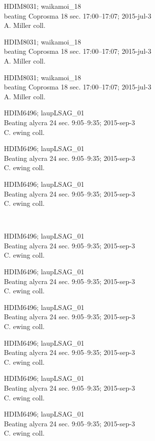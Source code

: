\documentclass[2pt]{extarticle}
\begin{document}
\noindent
\parbox{0.16\textwidth}{\tiny \raggedright \rule[-0.3\baselineskip]{0pt}{10pt}HDIM8031; waikamoi\_18\\ beating Coprosma 18 sec. 17:00--17:07; 2015-jul-3\\ A. Miller coll.}
\parbox{0.16\textwidth}{\tiny \raggedright \rule[-0.3\baselineskip]{0pt}{10pt}HDIM8031; waikamoi\_18\\ beating Coprosma 18 sec. 17:00--17:07; 2015-jul-3\\ A. Miller coll.}
\parbox{0.16\textwidth}{\tiny \raggedright \rule[-0.3\baselineskip]{0pt}{10pt}HDIM8031; waikamoi\_18\\ beating Coprosma 18 sec. 17:00--17:07; 2015-jul-3\\ A. Miller coll.}
\parbox{0.16\textwidth}{\tiny \raggedright \rule[-0.3\baselineskip]{0pt}{10pt}HDIM6496; laupLSAG\_01\\ Beating alycra 24 sec. 9:05--9:35; 2015-sep-3\\ C. ewing coll.}
\parbox{0.16\textwidth}{\tiny \raggedright \rule[-0.3\baselineskip]{0pt}{10pt}HDIM6496; laupLSAG\_01\\ Beating alycra 24 sec. 9:05--9:35; 2015-sep-3\\ C. ewing coll.}
\parbox{0.16\textwidth}{\tiny \raggedright \rule[-0.3\baselineskip]{0pt}{10pt}HDIM6496; laupLSAG\_01\\ Beating alycra 24 sec. 9:05--9:35; 2015-sep-3\\ C. ewing coll.} \\ 
\vspace{0.001in} 

\noindent
\parbox{0.16\textwidth}{\tiny \raggedright \rule[-0.3\baselineskip]{0pt}{10pt}HDIM6496; laupLSAG\_01\\ Beating alycra 24 sec. 9:05--9:35; 2015-sep-3\\ C. ewing coll.}
\parbox{0.16\textwidth}{\tiny \raggedright \rule[-0.3\baselineskip]{0pt}{10pt}HDIM6496; laupLSAG\_01\\ Beating alycra 24 sec. 9:05--9:35; 2015-sep-3\\ C. ewing coll.}
\parbox{0.16\textwidth}{\tiny \raggedright \rule[-0.3\baselineskip]{0pt}{10pt}HDIM6496; laupLSAG\_01\\ Beating alycra 24 sec. 9:05--9:35; 2015-sep-3\\ C. ewing coll.}
\parbox{0.16\textwidth}{\tiny \raggedright \rule[-0.3\baselineskip]{0pt}{10pt}HDIM6496; laupLSAG\_01\\ Beating alycra 24 sec. 9:05--9:35; 2015-sep-3\\ C. ewing coll.}
\parbox{0.16\textwidth}{\tiny \raggedright \rule[-0.3\baselineskip]{0pt}{10pt}HDIM6496; laupLSAG\_01\\ Beating alycra 24 sec. 9:05--9:35; 2015-sep-3\\ C. ewing coll.}
\parbox{0.16\textwidth}{\tiny \raggedright \rule[-0.3\baselineskip]{0pt}{10pt}HDIM6496; laupLSAG\_01\\ Beating alycra 24 sec. 9:05--9:35; 2015-sep-3\\ C. ewing coll.} \\ 
\vspace{0.001in} 
\end{document}
